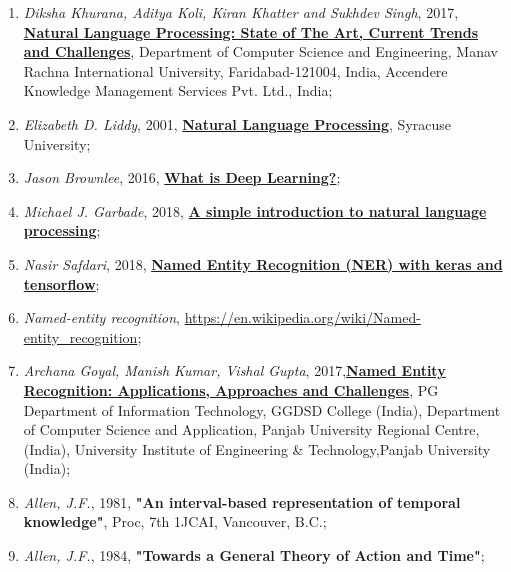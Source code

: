 \documentclass{report}
\begin{document}
\begin{enumerate}
\item \textit{Diksha Khurana, Aditya Koli, Kiran Khatter and Sukhdev Singh}, 2017, \href{https://arxiv.org/ftp/arxiv/papers/1708/1708.05148.pdf}{\textbf{Natural Language Processing: State of The Art, Current Trends and Challenges}}, Department of Computer Science and Engineering, Manav Rachna International University, Faridabad-121004, India, Accendere Knowledge Management Services Pvt. Ltd., India;

\item \textit{Elizabeth D. Liddy}, 2001, \href{https://surface.syr.edu/cgi/viewcontent.cgi?article=1043&context=istpub} {\textbf{Natural Language Processing}}, Syracuse University;

\item \textit{Jason Brownlee}, 2016, \href{https://machinelearningmastery.com/what-is-deep-learning/} {\textbf{What is Deep Learning?}};

\item \textit{Michael J. Garbade}, 2018, \href{https://becominghuman.ai/a-simple-introduction-to-natural-language-processing-ea66a1747b32}{\textbf{A simple introduction to natural language processing}};

\item \textit{Nasir Safdari}, 2018, \href{https://towardsdatascience.com/named-entity-recognition-ner-meeting-industrys-requirement-by-applying-state-of-the-art-deep-698d2b3b4ede}{\textbf{Named Entity Recognition (NER) with keras and tensorflow}};

\item \textit{Named-entity recognition}, \url{https://en.wikipedia.org/wiki/Named-entity_recognition};

\item \textit{Archana Goyal, Manish Kumar, Vishal Gupta}, 2017,\href{https://pdfs.semanticscholar.org/2060/5fdae23f6e8d945deb22e09c46cecebb4f35.pdf}{\textbf{Named Entity Recognition: Applications, Approaches and Challenges}}, PG Department of Information Technology, GGDSD College (India), Department of Computer Science and Application, Panjab University Regional Centre, (India), University Institute of Engineering \& Technology,Panjab University (India);

\item \textit{Allen, J.F.}, 1981, \textbf{"An interval-based representation of temporal knowledge"}, Proc, 7th 1JCAI, Vancouver, B.C.;

\item \textit{Allen, J.F.}, 1984, \textbf{"Towards a General Theory of Action and Time"};


\end{enumerate}
\end{document}
